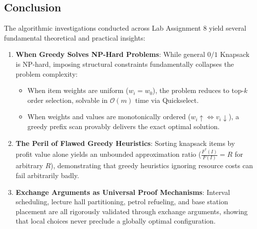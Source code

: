 \documentclass[12pt]{article}
\begin{document}
\subsection*{Conclusion}
The algorithmic investigations conducted across Lab Assignment 8 yield several fundamental theoretical and practical insights:
\begin{enumerate}
    \item \textbf{When Greedy Solves NP-Hard Problems}: While general $0/1$ Knapsack is NP-hard, imposing structural constraints fundamentally collapses the problem complexity:
    \begin{itemize}
        \item When item weights are uniform ($w_i = w_0$), the problem reduces to top-$k$ order selection, solvable in $\mathcal{O}(m)$ time via Quickselect.
        \item When weights and values are monotonically ordered ($w_i \uparrow \iff v_i \downarrow$), a greedy prefix scan provably delivers the exact optimal solution.
    \end{itemize}
    \item \textbf{The Peril of Flawed Greedy Heuristics}: Sorting knapsack items by profit value alone yields an unbounded approximation ratio ($\frac{F^*(I)}{F(I)} = R$ for arbitrary $R$), demonstrating that greedy heuristics ignoring resource costs can fail arbitrarily badly.
    \item \textbf{Exchange Arguments as Universal Proof Mechanisms}: Interval scheduling, lecture hall partitioning, petrol refueling, and base station placement are all rigorously validated through exchange arguments, showing that local choices never preclude a globally optimal configuration.
\end{enumerate}
\end{document}
